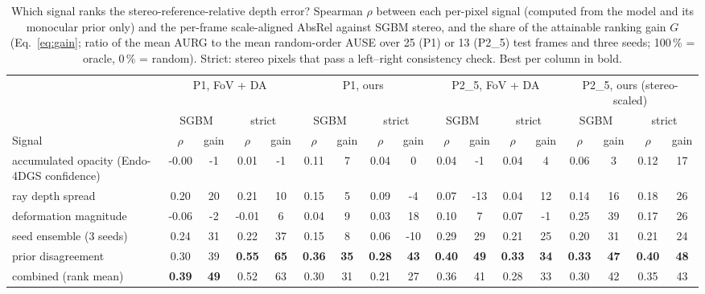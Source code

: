 \begin{table}[t]
\caption{Which signal ranks the stereo-reference-relative depth error? Spearman $\rho$ between each per-pixel signal (computed from the model and its monocular prior only) and the per-frame scale-aligned AbsRel against SGBM stereo, and the share of the attainable ranking gain $G$ (Eq.~\ref{eq:gain}; ratio of the mean AURG to the mean random-order AUSE over 25 (P1) or 13 (P2\_5) test frames and three seeds; 100\,\% = oracle, 0\,\% = random). Strict: stereo pixels that pass a left--right consistency check. Best per column in bold.}
\label{tab:unc}
\centering\scriptsize
\setlength{\tabcolsep}{3.2pt}
\begin{tabular}{@{}lcccccccccccccccc@{}}
\toprule
 & \multicolumn{4}{c}{P1, FoV + DA} & \multicolumn{4}{c}{P1, ours} & \multicolumn{4}{c}{P2\_5, FoV + DA} & \multicolumn{4}{c}{P2\_5, ours (stereo-scaled)} \\
\cmidrule(lr){2-5}\cmidrule(lr){6-9}\cmidrule(lr){10-13}\cmidrule(lr){14-17}
 & \multicolumn{2}{c}{SGBM} & \multicolumn{2}{c}{strict} & \multicolumn{2}{c}{SGBM} & \multicolumn{2}{c}{strict} & \multicolumn{2}{c}{SGBM} & \multicolumn{2}{c}{strict} & \multicolumn{2}{c}{SGBM} & \multicolumn{2}{c}{strict} \\
Signal & $\rho$ & gain & $\rho$ & gain & $\rho$ & gain & $\rho$ & gain & $\rho$ & gain & $\rho$ & gain & $\rho$ & gain & $\rho$ & gain \\
\midrule
accumulated opacity (Endo-4DGS confidence) & -0.00 & -1 & 0.01 & -1 & 0.11 & 7 & 0.04 & 0 & 0.04 & -1 & 0.04 & 4 & 0.06 & 3 & 0.12 & 17 \\
ray depth spread & 0.20 & 20 & 0.21 & 10 & 0.15 & 5 & 0.09 & -4 & 0.07 & -13 & 0.04 & 12 & 0.14 & 16 & 0.18 & 26 \\
deformation magnitude & -0.06 & -2 & -0.01 & 6 & 0.04 & 9 & 0.03 & 18 & 0.10 & 7 & 0.07 & -1 & 0.25 & 39 & 0.17 & 26 \\
seed ensemble (3 seeds) & 0.24 & 31 & 0.22 & 37 & 0.15 & 8 & 0.06 & -10 & 0.29 & 29 & 0.21 & 25 & 0.20 & 31 & 0.21 & 24 \\
prior disagreement & 0.30 & 39 & \textbf{0.55} & \textbf{65} & \textbf{0.36} & \textbf{35} & \textbf{0.28} & \textbf{43} & \textbf{0.40} & \textbf{49} & \textbf{0.33} & \textbf{34} & \textbf{0.33} & \textbf{47} & \textbf{0.40} & \textbf{48} \\
combined (rank mean) & \textbf{0.39} & \textbf{49} & 0.52 & 63 & 0.30 & 31 & 0.21 & 27 & 0.36 & 41 & 0.28 & 33 & 0.30 & 42 & 0.35 & 43 \\
\bottomrule
\end{tabular}
\end{table}
